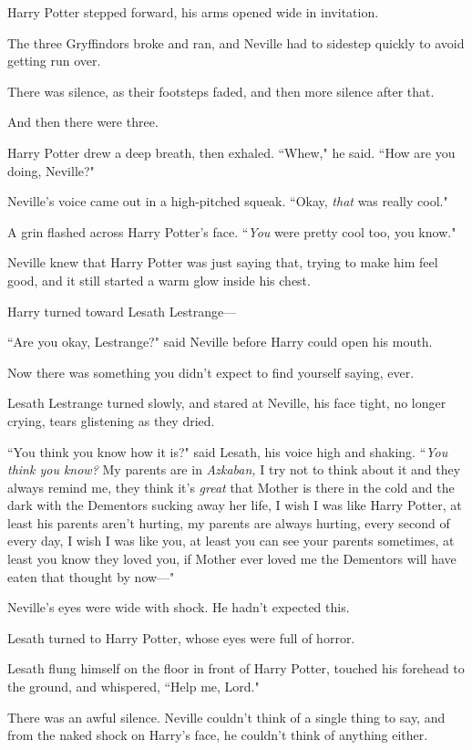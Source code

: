 Harry Potter stepped forward, his arms opened wide in invitation.

The three Gryffindors broke and ran, and Neville had to sidestep quickly to avoid getting run over.

There was silence, as their footsteps faded, and then more silence after that.

And then there were three.

Harry Potter drew a deep breath, then exhaled. ``Whew," he said. ``How are you doing, Neville?"

Neville's voice came out in a high-pitched squeak. ``Okay, \emph{that} was really cool."

A grin flashed across Harry Potter's face. ``\emph{You} were pretty cool too, you know."

Neville knew that Harry Potter was just saying that, trying to make him feel good, and it still started a warm glow inside his chest.

Harry turned toward Lesath Lestrange---

``Are you okay, Lestrange?" said Neville before Harry could open his mouth.

Now there was something you didn't expect to find yourself saying, ever.

Lesath Lestrange turned slowly, and stared at Neville, his face tight, no longer crying, tears glistening as they dried.

``You think you know how it is?" said Lesath, his voice high and shaking. ``\emph{You think you know?} My parents are in \emph{Azkaban,} I try not to think about it and they always remind me, they think it's \emph{great} that Mother is there in the cold and the dark with the Dementors sucking away her life, I wish I was like Harry Potter, at least his parents aren't hurting, my parents are always hurting, every second of every day, I wish I was like you, at least you can see your parents sometimes, at least you know they loved you, if Mother ever loved me the Dementors will have eaten that thought by now---"

Neville's eyes were wide with shock. He hadn't expected this.

Lesath turned to Harry Potter, whose eyes were full of horror.

Lesath flung himself on the floor in front of Harry Potter, touched his forehead to the ground, and whispered, ``Help me, Lord."

There was an awful silence. Neville couldn't think of a single thing to say, and from the naked shock on Harry's face, he couldn't think of anything either.

